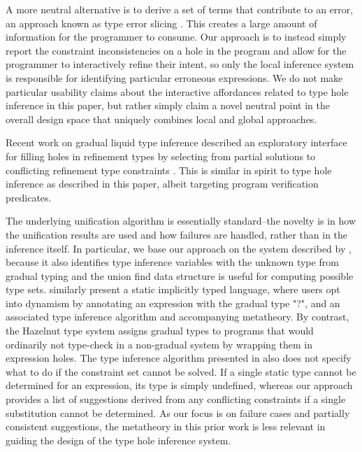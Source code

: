 A more neutral alternative is to derive a set of terms that contribute to an error, an approach known as type error slicing \cite{DBLP:conf/esop/HaackW03,DBLP:journals/tosem/TipD01,DBLP:conf/sfp/Schilling11}. This creates a large amount of information for the programmer to consume. Our approach is to instead simply report the constraint inconsistencies on a hole in the program and allow for the programmer to interactively refine their intent, so only the local inference system is responsible for identifying particular erroneous expressions. We do not make particular usability claims about the interactive affordances related to type hole inference in this paper, but rather simply claim a novel neutral point in the overall design space that uniquely combines local and global approaches. 

Recent work on gradual liquid type inference described an exploratory interface for filling holes in refinement types by selecting from partial solutions to conflicting refinement type constraints \cite{DBLP:journals/pacmpl/VazouTH18}. This is similar in spirit to type hole inference as described in this paper, albeit targeting program verification predicates. 


The underlying unification algorithm is essentially standard--the novelty is in how the unification results are used and how failures are handled, rather than in the inference itself. In particular, we base our approach on the system described by \cite{GradualInfer}, because it also identifies type inference variables with the unknown type from gradual typing and the union find data structure is useful for computing possible type sets. \citet{garcia:2015} similarly present a static implicitly typed language, where users opt into dynamism by annotating an expression with the gradual type "?", and an associated type inference algorithm and accompanying metatheory. By contrast, the Hazelnut type system assigns gradual types to programs that would ordinarily not type-check in a non-gradual system by wrapping them in expression holes. The type inference algorithm presented in \citet{garcia:2015} also does not specify what to do if the constraint set cannot be solved. If a single static type cannot be determined for an expression, its type is simply undefined, whereas our approach provides a list of suggestions derived from any conflicting constraints if a single substitution cannot be determined. As our focus is on failure cases and partially consistent suggestions, the metatheory in this prior work is less relevant in guiding the design of the type hole inference system.

